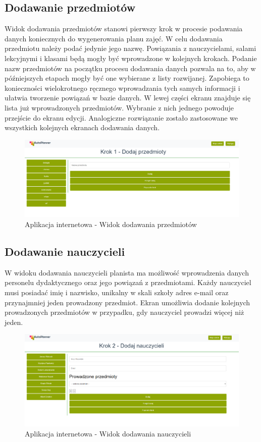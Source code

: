\subsection{Dodawanie przedmiotów}
Widok dodawania przedmiotów stanowi pierwszy krok w procesie podawania danych koniecznych do wygenerowania planu zajęć. W celu dodawania przedmiotu należy podać jedynie jego nazwę. Powiązania z nauczycielami, salami lekcyjnymi i klasami będą mogły być wprowadzone w kolejnych krokach. Podanie nazw przedmiotów na początku procesu dodawania danych pozwala na to, aby w późniejszych etapach mogły być one wybierane z listy rozwijanej. Zapobiega to konieczności wielokrotnego ręcznego wprowadzania tych samych informacji i ułatwia tworzenie powiązań w bazie danych. W lewej części ekranu znajduje się lista już wprowadzonych przedmiotów. Wybranie z nich jednego powoduje przejście do ekranu edycji. Analogiczne rozwiązanie zostało zastosowane we wszystkich kolejnych ekranach dodawania danych.
\begin{figure}[!ht]
\centering\includegraphics[width=\textwidth]{figures/subject}
\caption{Aplikacja internetowa - Widok dodawania przedmiotów}\label{rys:subject}
\end{figure}
\subsection{Dodawanie nauczycieli}
W widoku dodawania nauczycieli planista ma możliwość wprowadzenia danych personelu dydaktycznego oraz jego powiązań z przedmiotami. Każdy nauczyciel musi posiadać imię i nazwisko, unikalny w skali szkoły adres e-mail oraz przynajmniej jeden prowadzony przedmiot. Ekran umożliwia dodanie kolejnych prowadzonych przedmiotów w przypadku, gdy nauczyciel prowadzi więcej niż jeden. 
\begin{figure}[!ht]
\centering\includegraphics[width=\textwidth]{figures/teacher}
\caption{Aplikacja internetowa - Widok dodawania nauczycieli}\label{rys:teacher}
\end{figure}
